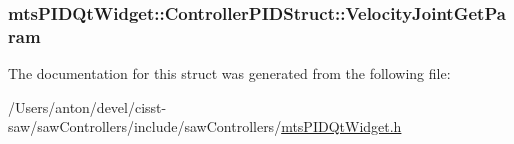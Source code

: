 \subsubsection[{Velocity\+Joint\+Get\+Param}]{ mts\+P\+I\+D\+Qt\+Widget\+::\+Controller\+P\+I\+D\+Struct\+::\+Velocity\+Joint\+Get\+Param}\label{structmts_p_i_d_qt_widget_1_1_controller_p_i_d_struct_a752b3f63f74d847587a28ecb6d451f4f}


The documentation for this struct was generated from the following file\+:\begin{DoxyCompactItemize}
\item 
/\+Users/anton/devel/cisst-\/saw/saw\+Controllers/include/saw\+Controllers/\hyperlink{mts_p_i_d_qt_widget_8h}{mts\+P\+I\+D\+Qt\+Widget.\+h}\end{DoxyCompactItemize}
